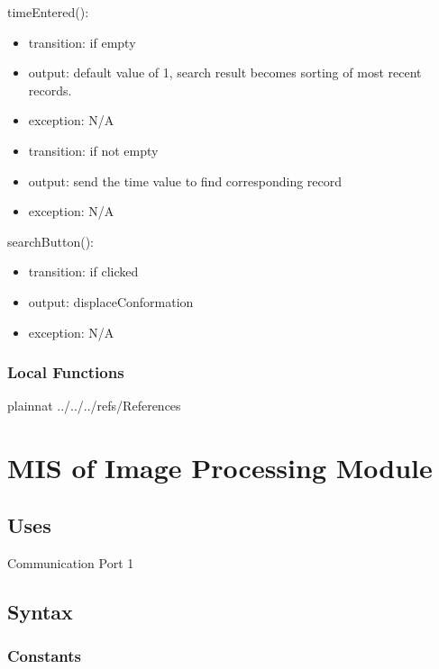 \documentclass[12pt, titlepage]{article}
\begin{document}
\noindent timeEntered():
\begin{itemize}
\item transition: if empty  
\item output: default value of 1, search result becomes sorting of most recent records.
\item exception: N/A
\item transition: if not empty  
\item output: send the time value to find corresponding record
\item exception: N/A
\end{itemize}
\noindent searchButton():
\begin{itemize}
\item transition: if clicked  
\item output: displaceConformation
\item exception: N/A
\end{itemize}



\subsubsection{Local Functions}

 

\newpage

 {plainnat}
 {../../../refs/References}

\newpage
\section{MIS of Image Processing Module} 

 

\subsection{Uses}

Communication Port 1

\subsection{Syntax}

\subsubsection{Constants}
\end{document}
